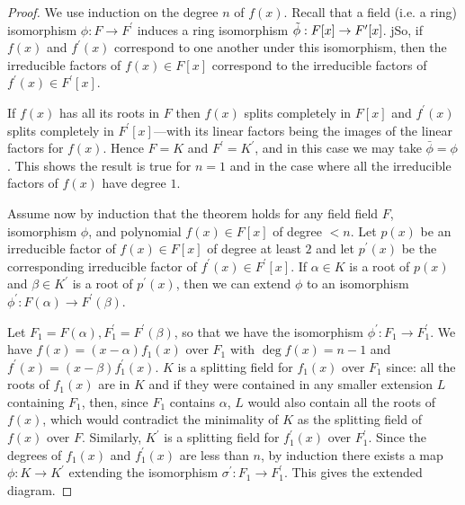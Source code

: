   \begin{proof}
    We use induction on the degree $n$ of $f(x)$. Recall that a field (i.e. a ring) isomorphism $\phi: F \to F^\prime$ induces a ring isomorphism $\Tilde{\phi}: F[x] \to F^\prime [x]$. jSo, if $f(x)$ and $f^\prime (x)$ correspond to one another under this isomorphism, then the irreducible factors of $f(x) \in F[x]$ correspond to the irreducible factors of $f^\prime (x) \in F^\prime [x]$. 

    If $f(x)$ has all its roots in $F$ then $f(x)$ splits completely in $F[x]$ and $f^\prime (x)$ splits completely in $F^\prime [x]$---with its linear factors being the images of the linear factors for $f(x)$. Hence $F = K$ and $F^\prime = K^\prime$, and in this case we may take $\bar{\phi} = \phi$. This shows the result is true for $n = 1$ and in the case where all the irreducible factors of $f(x)$ have degree $1$. 

    Assume now by induction that the theorem holds for any field field $F$, isomorphism $\phi$, and polynomial $f(x) \in F[x]$ of degree $< n$. Let $p(x)$ be an irreducible factor of $f(x) \in F[x]$ of degree at least $2$ and let $p^\prime (x)$ be the corresponding irreducible factor of $f^\prime (x) \in F^\prime [x]$. If $\alpha \in K$ is a root of $p(x)$ and $\beta \in K^\prime$ is a root of $p^\prime (x)$, then we can extend $\phi$ to an isomorphism $\phi^\prime: F(\alpha) \to F^\prime (\beta)$. 

    \begin{figure}[H]
      \centering 
    \end{figure}

    Let $F_1 = F(\alpha), F_1^\prime = F^\prime (\beta)$, so that we have the isomorphism $\phi^\prime :F_1 \to F_1^\prime$. We have $f(x) = (x - \alpha) f_1 (x)$ over $F_1$ with $\deg{f(x)} = n-1$ and $f^\prime (x) = (x - \beta) f_1^\prime(x)$. $K$ is a splitting field for $f_1 (x)$ over $F_1$ since: all the roots of $f_1 (x)$ are in $K$ and if they were contained in any smaller extension $L$ containing $F_1$, then, since $F_1$ contains $\alpha$, $L$ would also contain all the roots of $f(x)$, which would contradict the minimality of $K$ as the splitting field of $f(x)$ over $F$. Similarly, $K^\prime$ is a splitting field for $f_1^\prime (x)$ over $F_1^\prime$. Since the degrees of $f_1 (x)$ and $f_1^\prime (x)$ are less than $n$, by induction there exists a map $\phi: K \to K^\prime$ extending the isomorphism $\sigma^\prime: F_1 \to F_1^\prime$. This gives the extended diagram. 


\end{proof}
